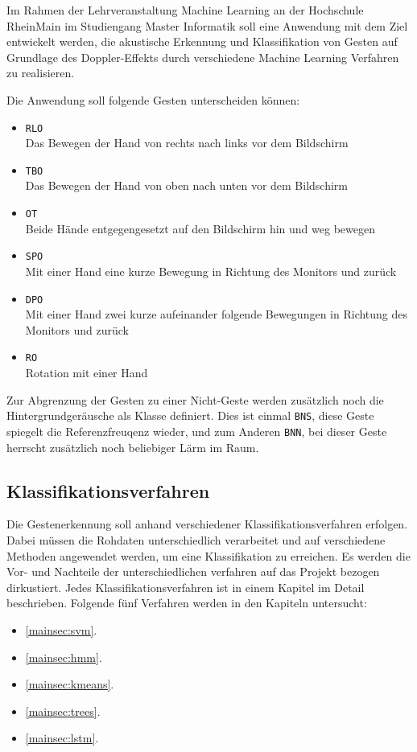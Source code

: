 Im Rahmen der Lehrveranstaltung Machine Learning an der Hochschule RheinMain im
Studiengang Master Informatik soll eine Anwendung mit dem Ziel entwickelt
werden, die akustische Erkennung und Klassifikation von Gesten auf Grundlage des
Doppler-Effekts durch verschiedene Machine Learning Verfahren zu realisieren.

Die Anwendung soll folgende Gesten unterscheiden können:
\begin{itemize}
	\item \texttt{\ac{RLO}}\\
	Das Bewegen der Hand von rechts nach links vor dem Bildschirm
	\item \texttt{\ac{TBO}}\\
	Das Bewegen der Hand von oben nach unten vor dem Bildschirm
	\item \texttt{\ac{OT}}\\
	Beide Hände entgegengesetzt auf den Bildschirm hin und weg bewegen
	\item \texttt{\ac{SPO}}\\
	Mit einer Hand eine kurze Bewegung in Richtung des Monitors und zurück
	\item \texttt{\ac{DPO}}\\
	Mit einer Hand zwei kurze aufeinander folgende Bewegungen in Richtung des Monitors und zurück
	\item \texttt{\ac{RO}}\\
	Rotation mit einer Hand
\end{itemize}

Zur Abgrenzung der Gesten zu einer Nicht-Geste werden zusätzlich noch die
Hintergrundgeräusche als Klasse definiert. Dies ist einmal \texttt{\ac{BNS}},
diese Geste spiegelt die Referenzfreuqenz wieder, und zum Anderen
\texttt{\ac{BNN}}, bei dieser Geste herrscht zusätzlich noch beliebiger Lärm im
Raum.

\subsection{Klassifikationsverfahren}
Die Gestenerkennung soll anhand verschiedener Klassifikationsverfahren erfolgen.
Dabei müssen die Rohdaten unterschiedlich verarbeitet und auf verschiedene
Methoden angewendet werden, um eine Klassifikation zu erreichen. Es werden die
Vor- und Nachteile der unterschiedlichen verfahren auf das Projekt bezogen
dirkustiert. Jedes Klassifikationsverfahren ist in einem Kapitel im Detail
beschrieben. Folgende fünf Verfahren werden in den Kapiteln untersucht:
\begin{itemize}
	\item \ref{mainsec:svm}. 
	\item \ref{mainsec:hmm}. 
	\item \ref{mainsec:kmeans}. 
	\item \ref{mainsec:trees}. 
	\item \ref{mainsec:lstm}. 
\end{itemize}


